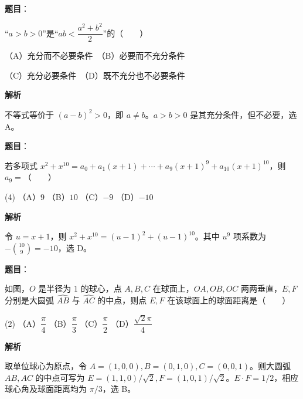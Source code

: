 \begin{answer}

\textbf{题目}：

“$a>b>0$”是“$ab<\dfrac{a^2+b^2}{2}$”的\mbox{（　　）}

（A）充分而不必要条件　（B）必要而不充分条件

（C）充分必要条件　（D）既不充分也不必要条件

\textbf{解析}

不等式等价于 $(a-b)^2>0$，即 $a\ne b$。$a>b>0$ 是其充分条件，但不必要，选 A。


\end{answer}
\begin{answer}

\textbf{题目}：

若多项式 $x^2+x^{10}=a_0+a_1(x+1)+\cdots+a_9(x+1)^9+a_{10}(x+1)^{10}$，则 $a_9=$\mbox{（　　）}

\begin{gkopts}(4)
\task （A）$9$
\task （B）$10$
\task （C）$-9$
\task （D）$-10$
\end{gkopts}

\textbf{解析}

令 $u=x+1$，则 $x^2+x^{10}=(u-1)^2+(u-1)^{10}$。其中 $u^9$ 项系数为 $-\binom{10}{9}=-10$，选 D。


\end{answer}
\begin{answer}

\textbf{题目}：

如图，$O$ 是半径为 $1$ 的球心，点 $A,B,C$ 在球面上，$OA,OB,OC$ 两两垂直，$E,F$ 分别是大圆弧 $\widehat{AB}$ 与 $\widehat{AC}$ 的中点，则点 $E,F$ 在该球面上的球面距离是\mbox{（　　）}

\begin{gkopts}(2)
\task （A）$\dfrac{\pi}{4}$
\task （B）$\dfrac{\pi}{3}$
\task （C）$\dfrac{\pi}{2}$
\task （D）$\dfrac{\sqrt2\pi}{4}$
\end{gkopts}
\nopagebreak[4]
\begin{center}\end{center}
\nopagebreak[4]
\textbf{解析}

取单位球心为原点，令 $A=(1,0,0),B=(0,1,0),C=(0,0,1)$。则大圆弧 $AB,AC$ 的中点可写为 $E=(1,1,0)/\sqrt2,F=(1,0,1)/\sqrt2$。$E\cdot F=1/2$，相应球心角及球面距离均为 $\pi/3$，选 B。


\end{answer}
